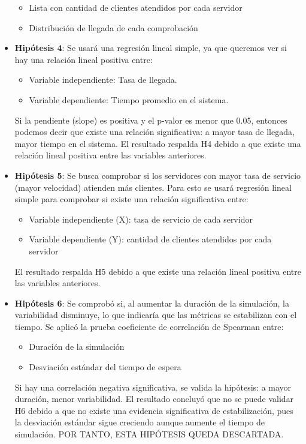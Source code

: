 \documentclass[12pt,a4paper]{article}
\begin{document}
\begin{itemize}
\begin{itemize}
\item Lista con cantidad de clientes atendidos por cada servidor
\item Distribución de llegada de cada comprobación
\end{itemize}
\item \textbf{Hipótesis 4}: Se usará una regresión lineal simple, ya que queremos ver si hay una relación lineal positiva entre:
\begin{itemize}
\item Variable independiente: Tasa de llegada.
\item Variable dependiente: Tiempo promedio en el sistema.
\end{itemize}
Si la pendiente (slope) es positiva y el p-valor es menor que 0.05, entonces podemos decir que existe una relación significativa:
a mayor tasa de llegada, mayor tiempo en el sistema. El resultado respalda H4 debido a que existe una relación lineal positiva
entre las variables anteriores.
\item \textbf{Hipótesis 5}: Se busca comprobar si los servidores con mayor tasa de servicio (mayor velocidad) atienden más clientes. Para esto se usará regresión lineal simple para comprobar si existe una relación significativa entre:
\begin{itemize}
\item Variable independiente (X): tasa de servicio de cada servidor
\item Variable dependiente (Y): cantidad de clientes atendidos por cada servidor
\end{itemize}
El resultado respalda H5 debido a que existe una relación lineal positiva entre las variables anteriores.
\item \textbf{Hipótesis 6}:  Se comprobó si, al aumentar la duración de la simulación, la variabilidad disminuye, lo que indicaría que las métricas se estabilizan con el tiempo. Se aplicó la prueba coeficiente de correlación de Spearman entre:
\begin{itemize}
\item Duración de la simulación
\item Desviación estándar del tiempo de espera
\end{itemize}
Si hay una correlación negativa significativa, se valida la hipótesis: a mayor duración, menor variabilidad. El resultado
concluyó que no se puede validar H6 debido a que no existe una evidencia significativa de estabilización, pues la desviación
estándar sigue creciendo aunque aumente el tiempo de simulación. POR TANTO, ESTA HIPÓTESIS QUEDA DESCARTADA.

\end{itemize}
\end{document}
